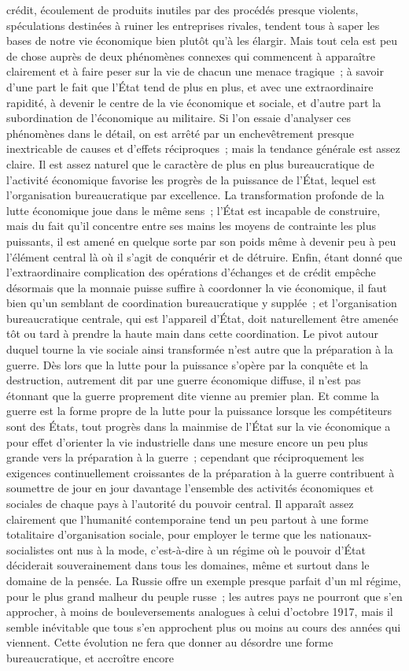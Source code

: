 \documentclass[french,twoside]{book} %
\begin{document}
crédit, écoulement de produits inutiles par des procédés presque violents, spéculations destinées à ruiner les entreprises rivales, tendent tous à saper les bases de notre vie économique bien plutôt qu'à les élargir. Mais tout cela est peu de chose auprès de deux phénomènes connexes qui commencent à apparaître clairement et à faire peser sur la vie de chacun une menace tragique ; à savoir d'une part le fait que l'État tend de plus en plus, et avec une extraordinaire rapidité, à devenir le centre de la vie économique et sociale, et d'autre part la subordination de l'économique au militaire. Si l'on essaie d'analyser ces phénomènes dans le détail, on est arrêté par un enchevêtrement presque inextricable de causes et d'effets réciproques ; mais la tendance générale est assez claire. Il est assez naturel que le caractère de plus en plus bureaucratique de l'activité économique favorise les progrès de la puissance de l'État, lequel est l'organisation bureaucratique par excellence. La transformation profonde de la lutte économique joue dans le même sens ; l'État est incapable de construire, mais du fait qu’il concentre entre ses mains les moyens de contrainte les plus puissants, il est amené en quelque sorte par son poids même à devenir peu à peu l'élément central là où il s'agit de conquérir et de détruire. Enfin, étant donné que l'extraordinaire complication des opérations d'échanges et de crédit empêche désormais que la monnaie puisse suffire à coordonner la vie économique, il faut bien qu'un semblant de coordination bureaucratique y supplée ; et l'organisation bureaucratique centrale, qui est l'appareil d'État, doit naturellement être amenée tôt ou tard à prendre la haute main dans cette coordination. Le pivot autour duquel tourne la vie sociale ainsi transformée n'est autre que la préparation à la guerre. Dès lors que la lutte pour la puissance s'opère par la conquête et la destruction, autrement dit par une guerre économique diffuse, il n'est pas étonnant que la guerre proprement dite vienne au premier plan. Et comme la guerre est la forme propre de la lutte pour la puissance lorsque les compétiteurs sont des États, tout progrès dans la mainmise de l'État sur la vie économique a pour effet d'orienter la vie industrielle dans une mesure encore un peu plus grande vers la préparation à la guerre ; cependant que réciproquement les exigences continuellement croissantes de la préparation à la guerre contribuent à soumettre de jour en jour davantage l'ensemble des activités économiques et sociales de chaque pays à l'autorité du pouvoir central. Il apparaît assez clairement que l'humanité contemporaine tend un peu partout à une forme totalitaire d'organisation sociale, pour employer le terme que les nationaux-socialistes ont nus à la mode, c'est-à-dire à un régime où le pouvoir d'État déciderait souverainement dans tous les domaines, même et surtout dans le domaine de la pensée. La Russie offre un exemple presque parfait d'un ml régime, pour le plus grand malheur du peuple russe ; les autres pays ne pourront que s'en approcher, à moins de bouleversements analogues à celui d'octobre 1917, mais il semble inévitable que tous s'en approchent plus ou moins au cours des années qui viennent. Cette évolution ne fera que donner au désordre une forme bureaucratique, et accroître encore 
\end{document}
